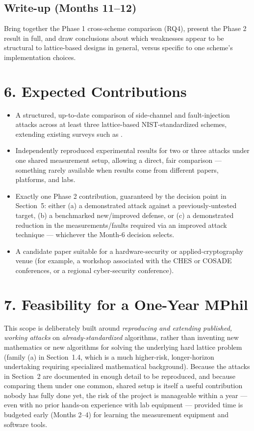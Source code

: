 \documentclass[11pt,a4paper]{article}
\begin{document}
\subsection*{Write-up (Months 11--12)}
Bring together the Phase 1 cross-scheme comparison (RQ4), present the Phase 2 result in full, and draw conclusions about which weaknesses appear to be structural to lattice-based designs in general, versus specific to one scheme's implementation choices.

\section*{6. Expected Contributions}

\begin{itemize}[leftmargin=*]
  \item A structured, up-to-date comparison of side-channel and fault-injection attacks across at least three lattice-based NIST-standardized schemes, extending existing surveys such as \cite{ravi2024survey}.
  \item Independently reproduced experimental results for two or three attacks under one shared measurement setup, allowing a direct, fair comparison --- something rarely available when results come from different papers, platforms, and labs.
  \item Exactly one Phase 2 contribution, guaranteed by the decision point in Section~5: either (a) a demonstrated attack against a previously-untested target, (b) a benchmarked new/improved defense, or (c) a demonstrated reduction in the measurements/faults required via an improved attack technique --- whichever the Month-6 decision selects.
  \item A candidate paper suitable for a hardware-security or applied-cryptography venue (for example, a workshop associated with the CHES or COSADE conferences, or a regional cyber-security conference).
\end{itemize}

\section*{7. Feasibility for a One-Year MPhil}

This scope is deliberately built around \emph{reproducing and extending published, working attacks} on \emph{already-standardized} algorithms, rather than inventing new mathematics or new algorithms for solving the underlying hard lattice problem (family (a) in Section~1.4, which is a much higher-risk, longer-horizon undertaking requiring specialized mathematical background). Because the attacks in Section~2 are documented in enough detail to be reproduced, and because comparing them under one common, shared setup is itself a useful contribution nobody has fully done yet, the risk of the project is manageable within a year --- even with no prior hands-on experience with lab equipment --- provided time is budgeted early (Months 2--4) for learning the measurement equipment and software tools.
\end{document}
